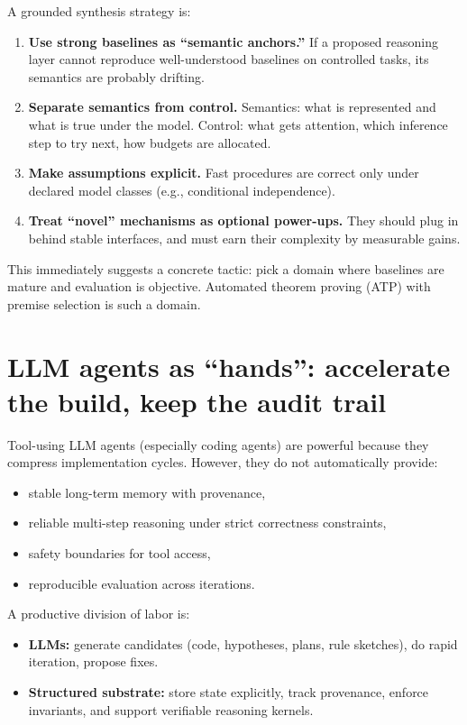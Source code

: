 \documentclass[11pt]{article}
\begin{document}
A grounded synthesis strategy is:

\begin{enumerate}[label=\textbf{G\arabic*.}, leftmargin=2em]
\item \textbf{Use strong baselines as ``semantic anchors.''} If a proposed reasoning layer cannot
reproduce well-understood baselines on controlled tasks, its semantics are probably drifting.
\item \textbf{Separate semantics from control.} Semantics: what is represented and what is true under the model.
Control: what gets attention, which inference step to try next, how budgets are allocated.
\item \textbf{Make assumptions explicit.} Fast procedures are correct only under declared model classes (e.g., conditional independence).
\item \textbf{Treat ``novel'' mechanisms as optional power-ups.} They should plug in behind stable interfaces,
and must earn their complexity by measurable gains.
\end{enumerate}

This immediately suggests a concrete tactic: pick a domain where baselines are mature and evaluation is objective.
Automated theorem proving (ATP) with premise selection is such a domain.

\section{LLM agents as ``hands'': accelerate the build, keep the audit trail}

Tool-using LLM agents (especially coding agents) are powerful because they compress implementation cycles.
However, they do not automatically provide:
\begin{itemize}[leftmargin=2em]
\item stable long-term memory with provenance,
\item reliable multi-step reasoning under strict correctness constraints,
\item safety boundaries for tool access,
\item reproducible evaluation across iterations.
\end{itemize}

A productive division of labor is:
\begin{itemize}[leftmargin=2em]
\item \textbf{LLMs:} generate candidates (code, hypotheses, plans, rule sketches), do rapid iteration, propose fixes.
\item \textbf{Structured substrate:} store state explicitly, track provenance, enforce invariants, and support verifiable reasoning kernels.
\end{itemize}
\end{document}
